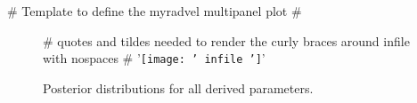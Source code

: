 {# Template to define the myradvel multipanel plot #}
\begin{figure*}[!h]
\centering
{# quotes and tildes needed to render the curly braces around infile with nospaces #}
{{'\texttt{[image: '~infile~']}'}}
\caption{Posterior distributions for all derived parameters.}
\end{figure*}
